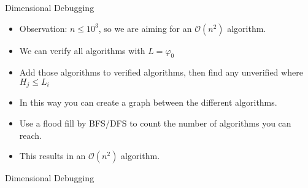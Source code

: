 \documentclass[11pt,pdf, aspectratio=169]{beamer}
\begin{document}
  \begin{frame}{Dimensional Debugging}
    \begin{itemize}
      \item Observation: $n \leq 10^3$, so we are aiming for an $\mathcal{O}(n^2)$ algorithm.
      \item We can verify all algorithms with $L = \varphi_0$
      \item Add those algorithms to verified algorithms, then find any unverified where $H_j \leq L_i$
      \item In this way you can create a graph between the different algorithms.
      \item Use a flood fill by BFS/DFS to count the number of algorithms you can reach.
      \item This results in an $\mathcal{O}(n^2)$ algorithm.
    \end{itemize}
  \end{frame}
  \begin{frame}[containsverbatim]{Dimensional Debugging}
    \inputminted[fontsize=\tiny]{python}{code/session-1/python/dapc-d.py}
  \end{frame}
\end{document}
